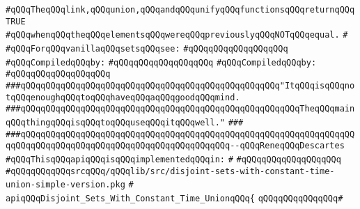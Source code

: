 \verb|#qQQqTheqQQqlink,qQQqunion,qQQqandqQQqunifyqQQqfunctionsqQQqreturnqQQqTRUE|\newline
\verb|#qQQqwhenqQQqtheqQQqelementsqQQqwereqQQqpreviouslyqQQqNOTqQQqequal.|\newline
\verb|#|\newline
\verb|#qQQqForqQQqvanillaqQQqsetsqQQqsee:|\newline
\verb|#qQQqqQQqqQQqqQQqqQQq|\newline
\newline
\verb|#qQQqCompiledqQQqby:|\newline
\verb|#qQQqqQQqqQQqqQQqqQQq|\newline
\newline
\newline
\verb|#qQQqCompiledqQQqby:|\newline
\verb|#qQQqqQQqqQQqqQQqqQQq|\newline
\newline
\verb|###qQQqqQQqqQQqqQQqqQQqqQQqqQQqqQQqqQQqqQQqqQQqqQQqqQQq"ItqQQqisqQQqnotqQQqenoughqQQqtoqQQqhaveqQQqaqQQqgoodqQQqmind.|\newline
\verb|###qQQqqQQqqQQqqQQqqQQqqQQqqQQqqQQqqQQqqQQqqQQqqQQqqQQqqQQqTheqQQqmainqQQqthingqQQqisqQQqtoqQQquseqQQqitqQQqwell."|\newline
\verb|###|\newline
\verb|###qQQqqQQqqQQqqQQqqQQqqQQqqQQqqQQqqQQqqQQqqQQqqQQqqQQqqQQqqQQqqQQqqQQqqQQqqQQqqQQqqQQqqQQqqQQqqQQqqQQqqQQqqQQqqQQq--qQQqReneqQQqDescartes|\newline
\newline
\newline
\newline
\verb|#qQQqThisqQQqapiqQQqisqQQqimplementedqQQqin:|\newline
\verb|#|\newline
\verb|#qQQqqQQqqQQqqQQqqQQq|\newline
\verb|#qQQqqQQqqQQqsrcqQQq/qQQqlib/src/disjoint-sets-with-constant-time-union-simple-version.pkg|\newline
\verb|#|\newline
\verb|apiqQQqDisjoint_Sets_With_Constant_Time_UnionqQQq{|\newline
\verb|qQQqqQQqqQQqqQQq#|\newline
